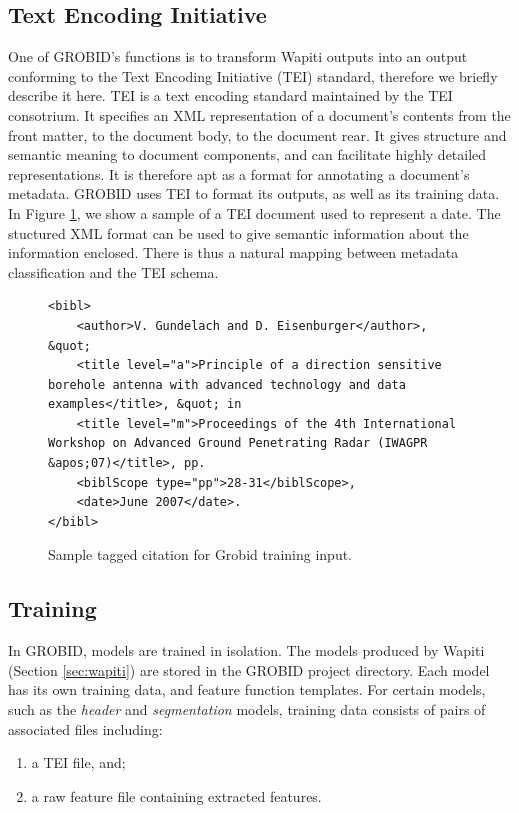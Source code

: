 \subsection{Text Encoding Initiative}
\label{subsec:tei}
One of GROBID's functions is to transform Wapiti outputs into an output conforming to the Text Encoding Initiative (TEI) standard, therefore we briefly describe it here. TEI is a text encoding standard maintained by the TEI consotrium. It specifies an XML representation of a document's contents from the front matter, to the document body, to the document rear. It gives structure and semantic meaning to document components, and can facilitate highly detailed representations. It is therefore apt as a format for annotating a document's metadata. GROBID uses TEI to format its outputs, as well as its training data. In Figure \ref{fig:tei}, we show a sample of a TEI document used to represent a date. The stuctured XML format can be used to give semantic information about the information enclosed. There is thus a natural mapping between metadata classification and the TEI schema.

\begin{figure}
\lstset{language=XML}
\begin{lstlisting}
<bibl>
    <author>V. Gundelach and D. Eisenburger</author>, &quot; 
    <title level="a">Principle of a direction sensitive borehole antenna with advanced technology and data examples</title>, &quot; in 
    <title level="m">Proceedings of the 4th International Workshop on Advanced Ground Penetrating Radar (IWAGPR &apos;07)</title>, pp. 
    <biblScope type="pp">28-31</biblScope>, 
    <date>June 2007</date>.
</bibl>
\end{lstlisting}
\caption{Sample tagged citation for Grobid training input.}
\label{fig:tei}
\end{figure}

\subsection{Training}
\label{subsec:training}

In GROBID, models are trained in isolation. The models produced by Wapiti (Section \ref{sec:wapiti}) are stored in the GROBID project directory. Each model has its own training data, and feature function templates. For certain models, such as the \emph{header} and \emph{segmentation} models, training data consists of pairs of associated files including:

\begin{enumerate}
\item a TEI file, and;
\item a raw feature file containing extracted features.
\end{enumerate}

